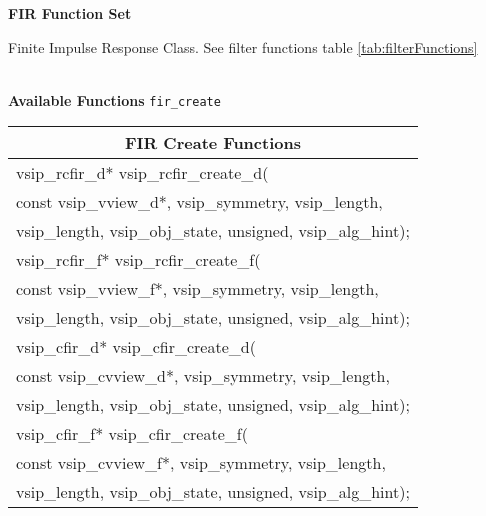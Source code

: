\clearpage
{\large \textbf{\hypertarget{firFunc}{FIR Function Set}}}\vspace{.2cm}\\
\hspace*{.3cm}
\parbox{0.85\textwidth}{Finite Impulse Response Class. See filter functions table \ref{tab:filterFunctions}}
\\\cvsiplh 
\newline \hspace*{.8cm} \vspace*{.1cm} \textbf{Available Functions }
\newline \hspace*{.8cm} \vspace*{.1cm} \texttt{fir\_create}
\newline \hspace*{1.cm} {
\ttfamily
\begin{tabular}[H]{|l|}
\hline \multicolumn{1}{c}{\rmfamily \bfseries FIR Create Functions\vspace{.1cm}}\\ \hline
vsip\_rcfir\_d* vsip\_rcfir\_create\_d(\\*\hspace{.6cm}const vsip\_vview\_d*, vsip\_symmetry, vsip\_length,\\*\hspace{.6cm}vsip\_length, vsip\_obj\_state, unsigned, vsip\_alg\_hint);\\
vsip\_rcfir\_f* vsip\_rcfir\_create\_f(\\*\hspace{.6cm}const vsip\_vview\_f*, vsip\_symmetry, vsip\_length,\\*\hspace{.6cm}vsip\_length, vsip\_obj\_state, unsigned, vsip\_alg\_hint);\\
vsip\_cfir\_d* vsip\_cfir\_create\_d(\\*\hspace{.6cm}const vsip\_cvview\_d*, vsip\_symmetry, vsip\_length,\\*\hspace{.6cm}vsip\_length, vsip\_obj\_state, unsigned, vsip\_alg\_hint);\\
vsip\_cfir\_f* vsip\_cfir\_create\_f(\\*\hspace{.6cm}const vsip\_cvview\_f*, vsip\_symmetry, vsip\_length,\\*\hspace{.6cm}vsip\_length, vsip\_obj\_state, unsigned, vsip\_alg\_hint);\\

\end{tabular}}
